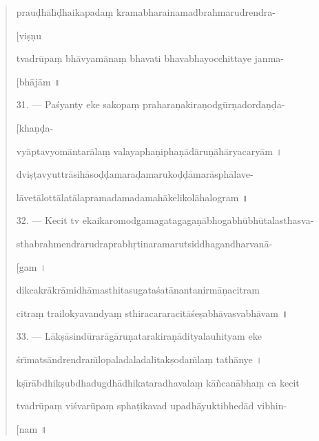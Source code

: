 \documentclass[a4paper, 11pt, oneside, french]{article}
\begin{document}
\begin{quotation}
prau\d{d}h\={a}l\={\i}\d{d}haikapada\d{m} kramabharainamadbrahmarudrendra-

\hspace*{85mm}[vi\d{s}\d{n}u

tvadr\={u}pa\d{m} bh\={a}vyam\={a}na\d{m} bhavati bhavabhayocchittaye janma-

\hspace*{85mm}[bh\={a}j\={a}m \texthindi{॥}

\bigskip

31. --- Pa\'{s}yanty eke sakopa\d{m} prahara\d{n}akira\d{n}odg\={u}r\d{n}adorda\d{n}\d{d}a-

\hspace*{85mm}[kha\d{n}\d{d}a-

vy\={a}ptavyom\={a}ntar\={a}la\d{m} valayapha\d{n}ipha\d{n}\={a}d\={a}ru\d{n}\={a}h\={a}ryacary\={a}m \texthindi{।}

dvi\d{s}\d{t}avyuttr\={a}sih\={a}so\d{d}\d{d}amara\d{d}amaruko\d{d}\d{d}\={a}mar\={a}sph\={a}lave-

l\={a}vet\={a}lott\={a}lat\={a}lapramadamadamah\={a}kelikol\={a}halogram \texthindi{॥}

\bigskip

32. --- Kecit tv ekaikaromodgamagatagaga\d{n}\={a}bhogabh\={u}bh\={u}talasthasva-

sthabrahmendrarudraprabh\d{r}tinaramarutsiddhagandharvan\={a}-

\hspace*{85mm}[gam \texthindi{।}

dikcakr\={a}kr\={a}midh\={a}masthitasugata\'{s}at\={a}nantanirm\={a}\d{n}acitram

citra\d{m} trailokyavandya\d{m} sthiracararacit\={a}\'{s}e\d{s}abh\={a}vasvabh\={a}vam \texthindi{॥}

\bigskip

33. --- L\={a}k\d{s}\={a}sind\={u}rar\={a}g\={a}ru\d{n}atarakira\d{n}\={a}dityalauhityam eke

\'{s}r\={\i}mats\={a}ndrendran\={\i}lopaladaladalitak\d{s}odan\={\i}la\d{m} tath\={a}nye \texthindi{।}

k\d{s}\={\i}r\={a}bdhik\d{s}ubdhadugdh\={a}dhikataradhavala\d{m} k\={a}\~{n}can\={a}bha\d{m} ca kecit

tvadr\={u}pa\d{m} vi\'{s}var\={u}pa\d{m} spha\d{t}ikavad upadh\={a}yuktibhed\={a}d vibhin-

\hspace*{85mm}[nam \texthindi{॥}

\bigskip


\end{quotation}
\end{document}
